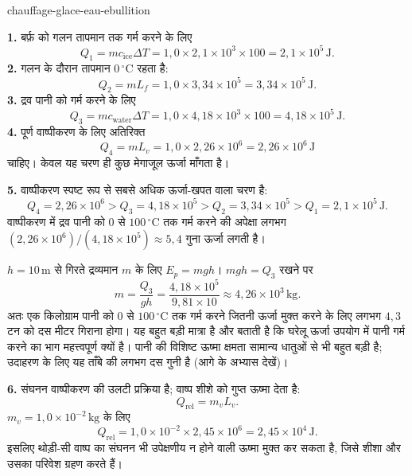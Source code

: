 \begin{exo}[ठंडी बर्फ़ से उबलते पानी तक: परिमाण-क्रम]{chauffage-glace-eau-ebullition}
\begin{solution}
\textbf{1.} बर्फ़ को गलन तापमान तक गर्म करने के लिए
\[
Q_1=mc_{\text{ice}}\Delta T
=1{,}0\times2{,}1\times10^3\times100=2{,}1\times10^5\,\text{J}.
\]
\textbf{2.} गलन के दौरान तापमान $0\,{}^\circ\text{C}$ रहता है:
\[
Q_2=mL_f=1{,}0\times3{,}34\times10^5=3{,}34\times10^5\,\text{J}.
\]
\textbf{3.} द्रव पानी को गर्म करने के लिए
\[
Q_3=mc_{\text{water}}\Delta T
=1{,}0\times4{,}18\times10^3\times100=4{,}18\times10^5\,\text{J}.
\]
\textbf{4.} पूर्ण वाष्पीकरण के लिए अतिरिक्त
\[
Q_4=mL_v=1{,}0\times2{,}26\times10^6=2{,}26\times10^6\,\text{J}
\]
चाहिए। केवल यह चरण ही कुछ मेगाजूल ऊर्जा माँगता है।

\textbf{5.} वाष्पीकरण स्पष्ट रूप से सबसे अधिक ऊर्जा-खपत वाला चरण है:
\[
Q_4=2{,}26\times10^6>Q_3=4{,}18\times10^5>Q_2=3{,}34\times10^5>Q_1=2{,}1\times10^5\,\text{J}.
\]
वाष्पीकरण में द्रव पानी को $0$ से $100\,{}^\circ\text{C}$ तक गर्म करने की अपेक्षा लगभग $(2{,}26\times10^6)/(4{,}18\times10^5)\approx5{,}4$ गुना ऊर्जा लगती है।

$h=10\,\text{m}$ से गिरते द्रव्यमान $m$ के लिए $E_p=mgh$। $mgh=Q_3$ रखने पर
\[
m=\frac{Q_3}{gh}=\frac{4{,}18\times10^5}{9{,}81\times10}
\approx4{,}26\times10^3\,\text{kg}.
\]
अतः एक किलोग्राम पानी को $0$ से $100\,{}^\circ\text{C}$ तक गर्म करने जितनी ऊर्जा मुक्त करने के लिए लगभग $4{,}3$ टन को दस मीटर गिराना होगा। यह बहुत बड़ी मात्रा है और बताती है कि घरेलू ऊर्जा उपयोग में पानी गर्म करने का भाग महत्त्वपूर्ण क्यों है। पानी की विशिष्ट ऊष्मा क्षमता सामान्य धातुओं से भी बहुत बड़ी है; उदाहरण के लिए यह ताँबे की लगभग दस गुनी है (आगे के अभ्यास देखें)।

\textbf{6.} संघनन वाष्पीकरण की उलटी प्रक्रिया है; वाष्प शीशे को गुप्त ऊष्मा देता है:
\[
Q_{\text{rel}}=m_vL_v.
\]
$m_v=1{,}0\times10^{-2}\,\text{kg}$ के लिए
\[
Q_{\text{rel}}=1{,}0\times10^{-2}\times2{,}45\times10^6
=2{,}45\times10^4\,\text{J}.
\]
इसलिए थोड़ी-सी वाष्प का संघनन भी उपेक्षणीय न होने वाली ऊष्मा मुक्त कर सकता है, जिसे शीशा और उसका परिवेश ग्रहण करते हैं।
\end{solution}
\end{exo}

